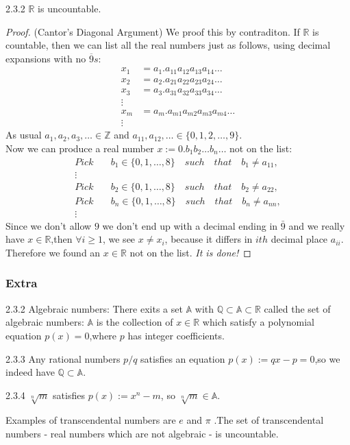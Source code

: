 \documentclass[a4paper]{article}
\def\rr{{\mathbb R}}
\begin{document}
\begin{theorem}{2.3.2}{}
    $\rr$ is uncountable.
\end{theorem}
\begin{proof}(Cantor's Diagonal Argument) We proof this by contraditon. If $\mathbb{R}$ is countable, then we can list all the real numbers just as follows, using decimal expansions with no $\overline{9}s$:
\begin{align*}
    x_1&=a_1.a_{11}a_{12}a_{13}a_{14}\ldots\\
    x_2&=a_2.a_{21}a_{22}a_{23}a_{24}\ldots\\
    x_3&=a_3.a_{31}a_{32}a_{33}a_{34}\ldots\\
    \vdots \\
    x_m&=a_m.a_{m1}a_{m2}a_{m3}a_{m4}\ldots\\
    \vdots
\end{align*}
As usual $a_1,a_2,a_3,\ldots\in \mathbb{Z}$ and $a_{11},a_{12},\ldots\in \{0,1,2,\ldots,9\}$.\\
Now we can produce a real number $x:=0.b_1b_2\ldots b_n\ldots$ not on the list:
\begin{align*}
    Pick& \quad b_1\in \{0,1,\ldots,8\}\quad such \quad that \quad b_1 \neq a_{11},\\
    \vdots\\
    Pick& \quad b_2\in \{0,1,\ldots,8\}\quad such \quad that \quad  b_2 \neq a_{22},\\
    Pick& \quad b_n\in \{0,1,\ldots,8\}\quad such \quad that \quad  b_n \neq a_{nn},\\
    \vdots
\end{align*}
Since we don't allow $9$ we don't end up with a decimal ending in $\bar{9}$ and we really have $x\in\mathbb{R}$,then $\forall i\geq 1$, we see $x \neq x_i$, because it differs in $ith$ decimal place $a_{ii}$.
Therefore we found an $x\in \mathbb{R}$ not on the list. \textit{It is done!}
\end{proof}
\subsubsection{Extra}
    \begin{definition}{2.3.2}{}
        Algebraic numbers: There exits a set $\mathbb{A}$ with $\mathbb{Q}\subset \mathbb{A}\subset \mathbb{R}$ called the set of algebraic numbers: $\mathbb{A}$ is the collection of $x\in \mathbb{R}$ which satisfy a polynomial equation $p(x)=0$,where $p$ has integer coefficients.
    \end{definition}
    \begin{proposition}{2.3.3}{}
        Any rational numbers $p/q$ satisfies an equation $p(x):=qx-p=0$,so we indeed have $\mathbb{Q}\subset\mathbb{A}$. 
         \end{proposition}
    \begin{proposition}{2.3.4}{}
           $\sqrt[n]{m}$ satisfies $p(x):=x^n-m$, so $\sqrt[n]{m}\in \mathbb{A}$.
    \end{proposition}
    Examples of transcendental numbers are $e$ and $\pi$ .The set of transcendental numbers - real numbers which are not algebraic - is uncountable.
\end{document}
